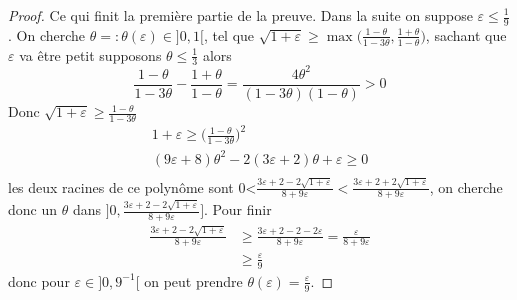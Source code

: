 \documentclass[12pt]{article}
\theoremstyle{definition}
\begin{document}
\begin{proof}
	Ce qui finit la première partie de la preuve. Dans la suite on suppose $\varepsilon\leq \frac{1}{9}$. On cherche $\theta=:\theta(\varepsilon)\in]0,1[$, tel que $\sqrt{1+\varepsilon}\geq \max\big(\frac{1-\theta}{1-3\theta},\frac{1+\theta}{1-\theta}\big)$, sachant que $\varepsilon$ va être petit supposons $\theta\leq \frac{1}{3}$ alors
	\begin{equation*}
	\frac{1-\theta}{1-3\theta}-\frac{1+\theta}{1-\theta} = \frac{4\theta^2}{(1-3\theta) (1-\theta)}>0
	\end{equation*}
	Donc $\sqrt{1+\varepsilon}\geq \frac{1-\theta}{1-3\theta}$
	\begin{equation*}
	\begin{array}{ccc}
	1+\varepsilon \geq  \big(\frac{1-\theta}{1-3\theta}\big)^2\\
	(9\varepsilon+8)\theta^2 - 2(3\varepsilon+2)\theta +\varepsilon \geq 0\\
	\end{array}
	\end{equation*}
	les deux racines de ce polynôme sont 0<$\frac{3\varepsilon+2-2\sqrt{1+\varepsilon}}{8+9\varepsilon}<\frac{3\varepsilon+2+2\sqrt{1+\varepsilon}}{8+9\varepsilon}$, on cherche donc un $\theta$ dans $]0,\frac{3\varepsilon+2-2\sqrt{1+\varepsilon}}{8+9\varepsilon}]$. Pour finir 
	\begin{align*}
	\frac{3\varepsilon+2-2\sqrt{1+\varepsilon}}{8+9\varepsilon}&\geq \frac{3\varepsilon+2-2-2\varepsilon}{8+9\varepsilon}=\frac{\varepsilon}{8+9\varepsilon}\\
	&\geq \frac{\varepsilon}{9}
	\end{align*}
	donc pour $\varepsilon\in]0,9^{-1}[$ on peut prendre $\theta(\varepsilon)=\frac{\varepsilon}{9}$.
\end{proof}
\end{document}
